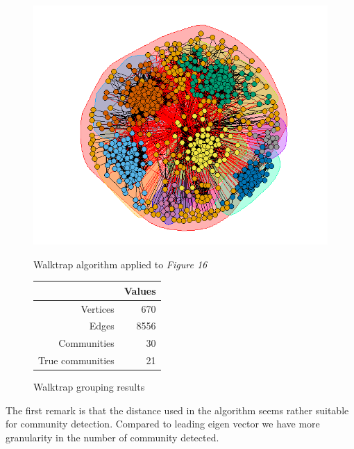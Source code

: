 \documentclass[11pt]{article}       %
\begin{document}
\begin{figure}[H]
\centering
\begin{minipage}[b]{0.47\linewidth}
\vspace{0pt}
\includegraphics[width=\linewidth]{zNetworkWalktrap.PNG}
\caption{Walktrap algorithm applied to \textit{Figure 16}}
\end{minipage}
\hspace{0.5cm}
\begin{minipage}[b]{0.45\linewidth}
\captionsetup{type=table}
\centering

\begin{tabular}[b]{rr}
  \hline
 & Values \\ 
  \hline
  Vertices & 670 \\
   Edges & 8556 \\
  Communities & 30 \\ 
  True communities & 21 \\ 
   \hline
\end{tabular}
\vspace{2cm}
\caption{Walktrap grouping results}
\end{minipage}
\end{figure}
\newline
The first remark is that the distance used in the algorithm seems rather suitable for community detection. Compared to leading eigen vector we have more granularity in the number of community detected. 
\end{document}
